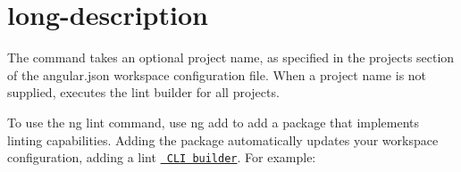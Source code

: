 \chapter{long-\/description}
\hypertarget{md__d_1_2_g_i_t_2_food_link_2foodlink_8client_2node__modules_2_0dangular_2cli_2src_2commands_2lint_2long-description}{}\label{md__d_1_2_g_i_t_2_food_link_2foodlink_8client_2node__modules_2_0dangular_2cli_2src_2commands_2lint_2long-description}
The command takes an optional project name, as specified in the {\ttfamily projects} section of the {\ttfamily angular.\+json} workspace configuration file. When a project name is not supplied, executes the {\ttfamily lint} builder for all projects.

To use the {\ttfamily ng lint} command, use {\ttfamily ng add} to add a package that implements linting capabilities. Adding the package automatically updates your workspace configuration, adding a lint \href{guide/cli-builder}{\texttt{ CLI builder}}. For example\+:


\begin{DoxyCode}{0}
\DoxyCodeLine{\ \ \ \ \ \ \}}
\DoxyCodeLine{\ \ \ \ \}}
\DoxyCodeLine{\ \ \}}
\DoxyCodeLine{\}}

\end{DoxyCode}
 